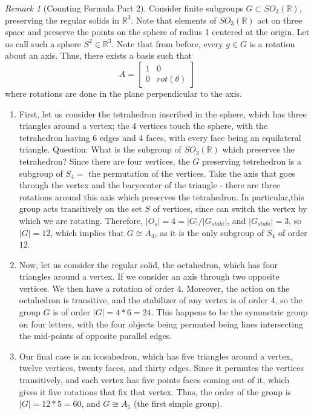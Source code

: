 \documentclass[12pt]{article}
\theoremstyle{definition}
\theoremstyle{remark}
\newtheorem{rmk}[thm]{Remark}
\numberwithin{equation}{section}
\newcommand\R{\mathbb R}    %
\begin{document}
\begin{rmk}[Counting Formula Part 2]
        Consider finite subgroups $G \subset SO_3(\R)$, preserving the regular solids in $\R^3$. Note that elements of $SO_3(\R)$ act on three space and preserve the points on the sphere of radius 1 centered at the origin. Let us call such a sphere $S^2 \in \R^3$. Note that from before, every $g \in G$ is a rotation about an axis. Thus, there exists a basis such that \begin{equation}
                A = \left[\begin{array}{c|c} 1 & 0 \\ \hline 0 & rot(\theta) \end{array}\right]
        \end{equation}
        where rotations are done in the plane perpendicular to the axis. \begin{enumerate}
                \item First, let us consider the tetrahedron inscribed in the sphere, which has three triangles around a vertex; the 4 vertices touch the sphere, with the tetrahedron having 6 edges and 4 faces, with every face being an equilateral triangle. Question: What is the subgroup of $SO_3(\R)$ which preserves the tetrahedron? Since there are four vertices, the $G$ preserving tetrehedron is a subgroup of $S_4 = $ the permutation of the vertices. Take the axis that goes through the vertex and the barycenter of the triangle - there are three rotations around this axis which preserves the tetrahedron. In particular,this group acts transitively on the set $S$ of vertices, since can switch the vertex by which we are rotating. Therefore, $|O_s| = 4 = |G|/|G_{stabi}|$, and $|G_{stabi}| = 3$, so $|G| = 12$, which implies that $G \cong A_4$, as it is the only subgroup of $S_4$ of order $12$.
                \item Now, let us consider the regular solid, the octahedron, which has four triangles around a vertex. If we consider an axis through two opposite vertices. We then have a rotation of order 4. Moreover, the action on the octahedron is transitive, and the stabilizer of any vertex is of order 4, so the group $G$ is of order $|G| = 4*6=24$. This happens to be the symmetric group on four letters, with the four objects being permuted being lines intersecting the mid-points of opposite parallel edges.
                \item Our final case is an icosahedron, which has five triangles around a vertex, twelve vertices, twenty faces, and thirty edges. Since it permutes the vertices transitively, and each vertex has five points faces coming out of it, which gives it five rotations that fix that vertex. Thus, the order of the group is $|G| = 12*5 = 60$, and $G \cong A_5$ (the first simple group). 
        \end{enumerate}
\end{rmk}
\end{document}
